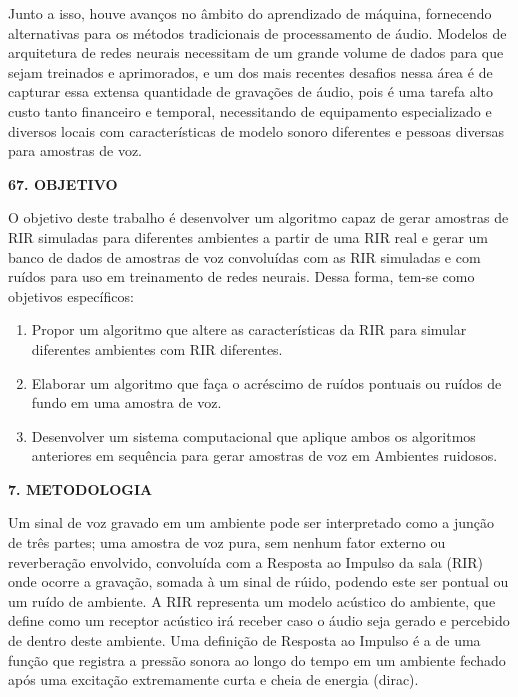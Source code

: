 \documentclass[a4paper,12pt,oneside,openany]{report}
\begin{document}

Junto a isso, houve avanços no âmbito do aprendizado de máquina, fornecendo alternativas para os métodos tradicionais de processamento de áudio.
Modelos de arquitetura de redes neurais necessitam de um grande volume de dados para que sejam treinados e aprimorados, e um dos mais recentes
desafios nessa área é de capturar essa extensa quantidade de gravações de áudio, pois é uma tarefa alto custo tanto financeiro e temporal, necessitando
de equipamento especializado e diversos locais com características de modelo sonoro diferentes e pessoas diversas para amostras de voz.

\vspace{0.4cm}
\textbf{67. OBJETIVO}

O objetivo deste trabalho é desenvolver um algoritmo capaz de gerar amostras de RIR simuladas para diferentes ambientes a partir de uma RIR real e
gerar um banco de dados de amostras de voz convoluídas com as RIR simuladas e com ruídos para uso em treinamento de redes neurais.
Dessa forma, tem-se como objetivos específicos:

\begin{enumerate}
      \item Propor um algoritmo que altere as características da RIR para simular diferentes ambientes com RIR diferentes.
      \item Elaborar um algoritmo que faça o acréscimo de ruídos pontuais ou ruídos de fundo em uma amostra de voz.
      \item Desenvolver um sistema computacional que aplique ambos os algoritmos anteriores em sequência para gerar
      amostras de voz em Ambientes ruidosos.
\end{enumerate}

\vspace{0.4cm}
\textbf{7. METODOLOGIA}

Um sinal de voz gravado em um ambiente pode ser interpretado como a junção de três
partes; uma amostra de voz pura, sem nenhum fator externo ou reverberação envolvido,
convoluída com a Resposta ao Impulso da sala (RIR) onde ocorre a gravação, somada à
um sinal de rúido, podendo este ser pontual ou um ruído de ambiente.
A RIR representa um modelo acústico do ambiente, que define como um receptor acústico
irá receber caso o áudio seja gerado e percebido de dentro deste ambiente.
Uma definição de Resposta ao Impulso é a de uma função que registra a pressão sonora 
ao longo do tempo em um ambiente fechado após uma excitação extremamente curta e 
cheia de energia (dirac).
\end{document}
